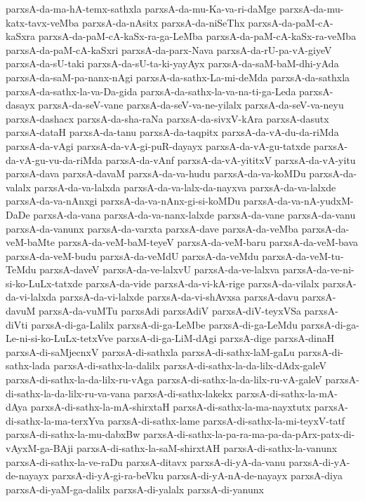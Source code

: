 {parxsA-da-ma-hA-temx-sathxla
parxsA-da-mu-Ka-va-ri-daMge
parxsA-da-mu-katx-tavx-veMba
parxsA-da-nAsitx
parxsA-da-niSeThx
parxsA-da-paM-cA-kaSxra
parxsA-da-paM-cA-kaSx-ra-ga-LeMba
parxsA-da-paM-cA-kaSx-ra-veMba
parxsA-da-paM-cA-kaSxri
parxsA-da-parx-Nava
parxsA-da-rU-pa-vA-giyeV
parxsA-da-sU-taki
parxsA-da-sU-ta-ki-yayAyx
parxsA-da-saM-baM-dhi-yAda
parxsA-da-saM-pa-nanx-nAgi
parxsA-da-sathx-La-mi-deMda
parxsA-da-sathxla
parxsA-da-sathx-la-va-Da-gida
parxsA-da-sathx-la-va-na-ti-ga-Leda
parxsA-dasayx
parxsA-da-seV-vane
parxsA-da-seV-va-ne-yilalx
parxsA-da-seV-va-neyu
parxsA-dashacx
parxsA-da-sha-raNa
parxsA-da-sivxV-kAra
parxsA-dasutx
parxsA-dataH
parxsA-da-tanu
parxsA-da-taqpitx
parxsA-da-vA-du-da-riMda
parxsA-da-vAgi
parxsA-da-vA-gi-puR-dayayx
parxsA-da-vA-gu-tatxde
parxsA-da-vA-gu-vu-da-riMda
parxsA-da-vAnf
parxsA-da-vA-yititxV
parxsA-da-vA-yitu
parxsA-dava
parxsA-davaM
parxsA-da-va-hudu
parxsA-da-va-koMDu
parxsA-da-valalx
parxsA-da-va-lalxda
parxsA-da-va-lalx-da-nayxva
parxsA-da-va-lalxde
parxsA-da-va-nAnxgi
parxsA-da-va-nAnx-gi-si-koMDu
parxsA-da-va-nA-yudxM-DaDe
parxsA-da-vana
parxsA-da-va-nanx-lalxde
parxsA-da-vane
parxsA-da-vanu
parxsA-da-vanunx
parxsA-da-varxta
parxsA-dave
parxsA-da-veMba
parxsA-da-veM-baMte
parxsA-da-veM-baM-teyeV
parxsA-da-veM-baru
parxsA-da-veM-bava
parxsA-da-veM-budu
parxsA-da-veMdU
parxsA-da-veMdu
parxsA-da-veM-tu-TeMdu
parxsA-daveV
parxsA-da-ve-lalxvU
parxsA-da-ve-lalxva
parxsA-da-ve-ni-si-ko-LuLx-tatxde
parxsA-da-vide
parxsA-da-vi-kA-rige
parxsA-da-vilalx
parxsA-da-vi-lalxda
parxsA-da-vi-lalxde
parxsA-da-vi-shAvxsa
parxsA-davu
parxsA-davuM
parxsA-da-vuMTu
parxsAdi
parxsAdiV
parxsA-diV-teyxVSa
parxsA-diVti
parxsA-di-ga-Lalilx
parxsA-di-ga-LeMbe
parxsA-di-ga-LeMdu
parxsA-di-ga-Le-ni-si-ko-LuLx-tetxVve
parxsA-di-ga-LiM-dAgi
parxsA-dige
parxsA-dinaH
parxsA-di-saMjecnxV
parxsA-di-sathxla
parxsA-di-sathx-laM-gaLu
parxsA-di-sathx-lada
parxsA-di-sathx-la-dalilx
parxsA-di-sathx-la-da-lilx-dAdx-galeV
parxsA-di-sathx-la-da-lilx-ru-vAga
parxsA-di-sathx-la-da-lilx-ru-vA-galeV
parxsA-di-sathx-la-da-lilx-ru-va-vana
parxsA-di-sathx-lakekx
parxsA-di-sathx-la-mA-dAya
parxsA-di-sathx-la-mA-shirxtaH
parxsA-di-sathx-la-ma-nayxtutx
parxsA-di-sathx-la-ma-terxYva
parxsA-di-sathx-lame
parxsA-di-sathx-la-mi-teyxV-tatf
parxsA-di-sathx-la-mu-dabxBw
parxsA-di-sathx-la-pa-ra-ma-pa-da-pArx-patx-di-vAyxM-ga-BAji
parxsA-di-sathx-la-saM-shirxtAH
parxsA-di-sathx-la-vanunx
parxsA-di-sathx-la-ve-raDu
parxsA-ditavx
parxsA-di-yA-da-vanu
parxsA-di-yA-de-nayayx
parxsA-di-yA-gi-ra-beVku
parxsA-di-yA-nA-de-nayayx
parxsA-diya
parxsA-di-yaM-ga-dalilx
parxsA-di-yalalx
parxsA-di-yanunx
}

